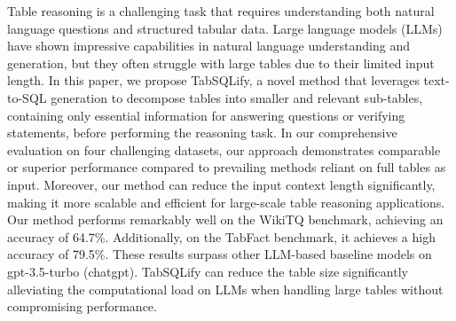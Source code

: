 Table reasoning is a challenging task that requires understanding both natural language questions and structured tabular data. Large language models (LLMs) have shown impressive capabilities in natural language understanding and generation, but they often struggle with large tables due to their limited input length. In this paper, we propose TabSQLify, a novel method that leverages text-to-SQL generation to decompose tables into smaller and relevant sub-tables, containing only essential information for answering questions or verifying statements, before performing the reasoning task. In our comprehensive evaluation on four challenging datasets, our approach demonstrates comparable or superior performance compared to prevailing methods reliant on full tables as input. Moreover, our method can reduce the input context length significantly, making it more scalable and efficient for large-scale table reasoning applications. Our method performs remarkably well on the WikiTQ benchmark, achieving an accuracy of 64.7\%. Additionally, on the TabFact benchmark, it achieves a high accuracy of 79.5\%. These results surpass other LLM-based baseline models on gpt-3.5-turbo (chatgpt). TabSQLify can reduce the table size significantly alleviating the computational load on LLMs when handling large tables without compromising performance.